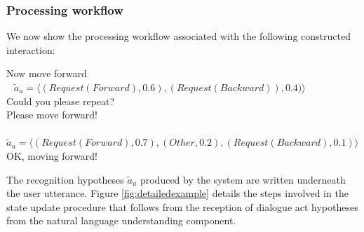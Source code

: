 \subsubsection*{Processing workflow}

We now show the processing workflow associated with the following constructed interaction:
\begin{dialogue} 
 Now move forward \\ $\phantom{b}$ $\tilde{a}_u = \langle (\mathit{Request(Forward)}, 0.6), (\mathit{Request(Backward)}), 0.4)\rangle$  \\[-3mm]
 Could you please repeat? \\[-3mm]
 Please move forward! \\ $\phantom{b}$ $\tilde{a}_u = \langle (\mathit{Request(Forward)}, 0.7), (\mathit{Other}, 0.2), (\mathit{Request(Backward)}, 0.1) \rangle$ \\[-3mm]
 OK, moving forward!
\end{dialogue}

The recognition hypotheses $\tilde{a}_u$ produced by the system are written underneath the user utterance.  Figure \ref{fig:detailedexample} details the steps involved in the state update procedure that follows from the reception of dialogue act hypotheses from the natural language understanding component. 


